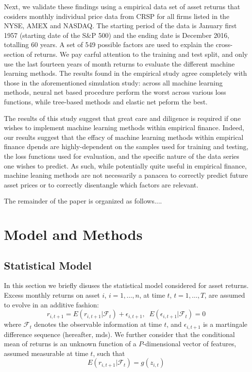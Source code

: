 \documentclass{article}
\begin{document}
Next, we validate these findings using a empirical data set of asset returns that cosiders monthly individual price data from CRSP for all firms listed in the NYSE, AMEX and NASDAQ. The starting period of the data is January first 1957 (starting date of the S\&P 500) and the ending date is December 2016, totalling 60 years. A set of 549 possible factors are used to explain the cross-section of returns. We pay carful attention to the training and test split, and only use the last fourteen years of month returns to evaluate the different machine learning methods. The results found in the empirical study agree completely with those in the aforementioned simulation study: across all machine learning methods, neural net based procedure perform the worst across various loss functions, while tree-based methods and elastic net peform the best. 

The results of this study suggest that great care and diligence is required if one wishes to implement machine learning methods within empirical finance. Indeed, our results suggest that the effacy of machine learning methods within empirical finance dpends are highly-dependent on the samples used for training and testing, the loss functions used for evaluation, and the specific nature of the data series one wishes to predict. As such, while potentially quite useful in empirical finance, machine leaning methods are not necessarily a panacea to correctly predict future asset prices or to correctly disentangle which factors are relevant. 

The remainder of the paper is organized as follows.... 


\section{Model and Methods}
\subsection{Statistical Model}
In this section we briefly disuses the statistical model considered for asset returns. Excess monthly returns on asset $i$, $i=1,\dots,n$, at time $t$, $t=1,\dots,T$, are assumed to evolve in an additive fashion:
\begin{equation}\label{eq:model}
r_{i, t+1} = E(r_{i, t+1} | \mathcal{F}_t) + \epsilon_{i, t+1},\;\;E(\epsilon_{i, t+1}|\mathcal{F}_{t})=0
\end{equation}where $\mathcal{F}_t$ denotes the observable information at time $t$, and $\epsilon_{i,t+1}$ is a martingale difference sequence (hereafter, mds). We further consider that the conditional mean of returns is an unknown function of a $P$-dimensional vector of features, assumed measurable at time $t$, such that 
\begin{equation}
E(r_{i, t+1} | \mathcal{F}_t) = g(z_{i,t})
\end{equation} 
\end{document}

